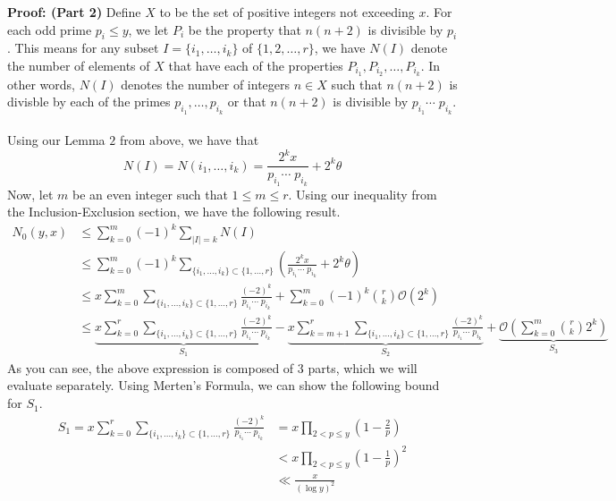 \begin{boxedsection}
    \textbf{Proof: (Part 2)} Define $X$ to be the set of positive integers not exceeding $x$. 
    For each odd prime $p_i \leq y$, we let $P_i$ be the property that $n(n+2)$ is divisible by $p_i$. This means for any subset $I = \{i_1, \dots, i_k\}$ of $\{1,2,\dots,r\}$, we have $N(I)$ denote the number of elements of $X$ that have each of the properties $P_{i_1}, P_{i_2}, \dots, P_{i_k}$. In other words, $N(I)$ denotes the number of integers $n \in X$ 
    such that $n(n+2)$ is divisble by each of the primes $p_{i_1}, \dots, p_{i_k}$ or that $n(n+2)$ is divisible by $p_{i_1}\cdots\; p_{i_k}$.\\
    \\
    Using our Lemma $2$ from above, we have that 
    $$
    N(I) = N(i_1, \dots, i_k) = \frac{2^k x}{p_{i_1} \cdots\; p_{i_k}} + 2^k\theta
    $$
    Now, let $m$ be an even integer such that $1 \leq m \leq r$. Using our inequality from the Inclusion-Exclusion section, we have the following result.
    \begin{align*}
        N_0(y,x) &\leq \sum_{k=0}^m (-1)^k \sum_{|I| = k} N(I)\\
        &\leq \sum_{k=0}^m (-1)^k \sum_{\{i_1, \dots, i_k\} \subset \{1,\dots,r\}} \left(\frac{2^k x}{p_{i_1} \cdots \;p_{i_k}} + 2^k\theta\right)\\
        &\leq x \sum_{k=0}^m \sum_{\{i_1, \dots, i_k\} \subset \{1,\dots,r\}} \frac{(-2)^k}{p_{i_1} \cdots \;p_{i_k}} + \sum_{k=0}^m (-1)^k {r \choose k} \mathcal{O}(2^k)\\
        &\leq \underbrace{x \sum_{k=0}^r \sum_{\{i_1, \dots, i_k\} \subset \{1,\dots,r\}} \frac{(-2)^k}{p_{i_1} \cdots \;p_{i_k}}}_{S_1} - \underbrace{x \sum_{k=m+1}^r \sum_{\{i_1, \dots, i_k\} \subset \{1,\dots,r\}} \frac{(-2)^k}{p_{i_1} \cdots \;p_{i_k}}}_{S_2} + \underbrace{\mathcal{O}\left(\sum_{k=0}^m {r \choose k} 2^k\right)}_{S_3}
    \end{align*}
    As you can see, the above expression is composed of $3$ parts, which we will evaluate separately. Using Merten's Formula, we can show the following bound for $S_1$.
    \begin{align*}
        S_1 = x \sum_{k=0}^r \sum_{\{i_1, \dots, i_k\} \subset \{1,\dots,r\}} \frac{(-2)^k}{p_{i_1} \cdots \;p_{i_k}} &= x \prod_{2 < p \leq y} \left(1- \frac{2}{p}\right)\\
        &< x \prod_{2 < p \leq y} \left(1- \frac{1}{p}\right)^2\\
        &\ll \frac{x}{(\log y)^2}
    \end{align*}

\end{boxedsection}
